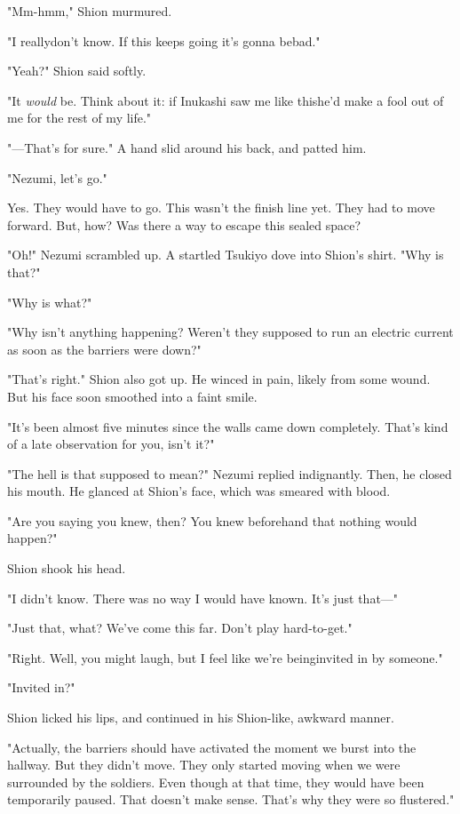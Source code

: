 "Mm-hmm," Shion murmured.

"I really\el don't know. If this keeps going it's gonna be\el bad."

"Yeah?" Shion said softly.

"It \emph{would} be. Think about it: if Inukashi saw me like this\el he'd make
a fool out of me for the rest of my life."

"---That's for sure." A hand slid around his back, and patted him.

"Nezumi, let's go."

Yes. They would have to go. This wasn't the finish line yet. They had to
move forward. But, how? Was there a way to escape this sealed space?

"Oh!" Nezumi scrambled up. A startled Tsukiyo dove into Shion's shirt.
"Why is that?"

"Why is what?"

"Why isn't anything happening? Weren't they supposed to run an electric
current as soon as the barriers were down?"

"That's right." Shion also got up. He winced in pain, likely from some
wound. But his face soon smoothed into a faint smile.

"It's been almost five minutes since the walls came down completely.
That's kind of a late observation for you, isn't it?"

"The hell is that supposed to mean?" Nezumi replied indignantly. Then,
he closed his mouth. He glanced at Shion's face, which was smeared with
blood.

"Are you saying you knew, then? You knew beforehand that nothing would
happen?"

Shion shook his head.

"I didn't know. There was no way I would have known. It's just that---"

"Just that, what? We've come this far. Don't play hard-to-get."

"Right. Well, you might laugh, but I feel like we're being\el invited in
by someone."

"Invited in?"

Shion licked his lips, and continued in his Shion-like, awkward manner.

"Actually, the barriers should have activated the moment we burst into
the hallway. But they didn't move. They only started moving when we were
surrounded by the soldiers. Even though at that time, they would have
been temporarily paused. That doesn't make sense. That's why they were
so flustered."

